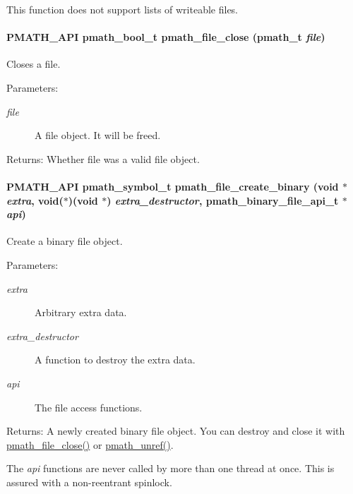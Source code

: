 This function does not support lists of writeable files. \hypertarget{group__file__api_g61142920bd7a8f066af908092c84d8e4}{
\paragraph[{pmath\_\-file\_\-close}]{\setlength{\rightskip}{0pt plus 5cm}PMATH\_\-API {\bf pmath\_\-bool\_\-t} pmath\_\-file\_\-close ({\bf pmath\_\-t} {\em file})}\hfill}
\label{group__file__api_g61142920bd7a8f066af908092c84d8e4}


Closes a file. 

\begin{Desc}
\item[Parameters:]
\begin{description}
\item[{\em file}]A file object. It will be freed. \end{description}
\end{Desc}
\begin{Desc}
\item[Returns:]Whether file was a valid file object. \end{Desc}
\hypertarget{group__file__api_g121e1c31d32fa30b60c8bb4d0808f4eb}{
\paragraph[{pmath\_\-file\_\-create\_\-binary}]{\setlength{\rightskip}{0pt plus 5cm}PMATH\_\-API {\bf pmath\_\-symbol\_\-t} pmath\_\-file\_\-create\_\-binary (void $\ast$ {\em extra}, \/  void($\ast$)(void $\ast$) {\em extra\_\-destructor}, \/  {\bf pmath\_\-binary\_\-file\_\-api\_\-t} $\ast$ {\em api})}\hfill}
\label{group__file__api_g121e1c31d32fa30b60c8bb4d0808f4eb}


Create a binary file object. 

\begin{Desc}
\item[Parameters:]
\begin{description}
\item[{\em extra}]Arbitrary extra data. \item[{\em extra\_\-destructor}]A function to destroy the extra data. \item[{\em api}]The file access functions. \end{description}
\end{Desc}
\begin{Desc}
\item[Returns:]A newly created binary file object. You can destroy and close it with \hyperlink{group__file__api_g61142920bd7a8f066af908092c84d8e4}{pmath\_\-file\_\-close()} or \hyperlink{classpmath__t_54e905402c38940687033b87eb8c6c9f}{pmath\_\-unref()}.\end{Desc}
The {\em api\/} functions are never called by more than one thread at once. This is assured with a non-reentrant spinlock.

